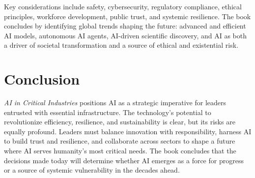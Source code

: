 Key considerations include safety, cybersecurity, regulatory compliance, ethical principles, workforce development, 
public trust, and systemic resilience. The book concludes by identifying global trends shaping the future: 
advanced and efficient AI models, autonomous AI agents, AI-driven scientific discovery, and AI as both a driver 
of societal transformation and a source of ethical and existential risk. 

\section*{Conclusion}
\emph{AI in Critical Industries} positions AI as a strategic imperative for leaders entrusted with essential infrastructure. 
The technology’s potential to revolutionize efficiency, resilience, and sustainability is clear, but its risks are equally profound. 
Leaders must balance innovation with responsibility, harness AI to build trust and resilience, and collaborate across sectors to shape 
a future where AI serves humanity’s most critical needs. The book concludes that the decisions made today will determine whether AI 
emerges as a force for progress or a source of systemic vulnerability in the decades ahead. 